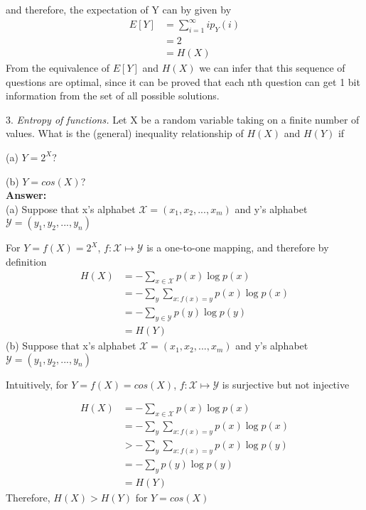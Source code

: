 \documentclass[12pt]{article}
\begin{document}
	and therefore, the expectation of Y can by given by 
	\begin{align*}
		E[Y] &= \sum_{i=1}^{\infty}ip_Y(i) \\
			 &= 2 \\
			 &= H(X) 
	\end{align*}
	From the equivalence of $E[Y]$ and $H(X)$ we can infer that this sequence of questions are optimal, since it can be proved that each nth question can get 1 bit information from the set of all possible solutions.\\
	\par 
	3. \textit{Entropy of functions.} Let X be a random variable taking on a finite number of values. What is the (general) inequality relationship of $H(X)$ and $H(Y)$ if \par 
	(a) $Y = 2^X$? \par 
	(b) $Y = cos(X)$? \\
	\textbf{Answer:} \\
	(a) Suppose that x's alphabet $\mathcal{X} = (x_1,x_2,...,x_m)$ and y's alphabet $\mathcal{Y} = (y_1,y_2,...,y_n)$  \par 
		For $Y = f(X) = 2^X$, $f:\mathcal{X}\mapsto\mathcal{Y}$ is a one-to-one mapping, and therefore by definition
		\begin{align*}
			H(X) &= -\sum_{x\in\mathcal{X}}p(x)\log p(x) \\
			     &= -\sum_{y}\sum_{x:f(x)=y}p(x)\log p(x) \\
			     &= -\sum_{y\in\mathcal{Y}}p(y)\log p(y) \\
			     &= H(Y)
		\end{align*}
	(b) Suppose that x's alphabet $\mathcal{X} = (x_1,x_2,...,x_m)$ and y's alphabet $\mathcal{Y} = (y_1,y_2,...,y_n)$  \par 
		Intuitively, for $Y = f(X) = cos(X)$, $f:\mathcal{X}\mapsto\mathcal{Y}$ is surjective but not injective \par 
		\begin{align*}
			H(X) &= -\sum_{x\in\mathcal{X}}p(x)\log p(x) \\
			     &= -\sum_{y}\sum_{x:f(x)=y}p(x)\log p(x) \\
			     &> -\sum_{y}\sum_{x:f(x)=y}p(x)\log p(y) \\
			     &= -\sum_{y}p(y)\log p(y) \\
			     &= H(Y)
		\end{align*}  
		Therefore, $H(X) > H(Y)$ for $Y = cos(X)$ \\
		\par 
\end{document}
